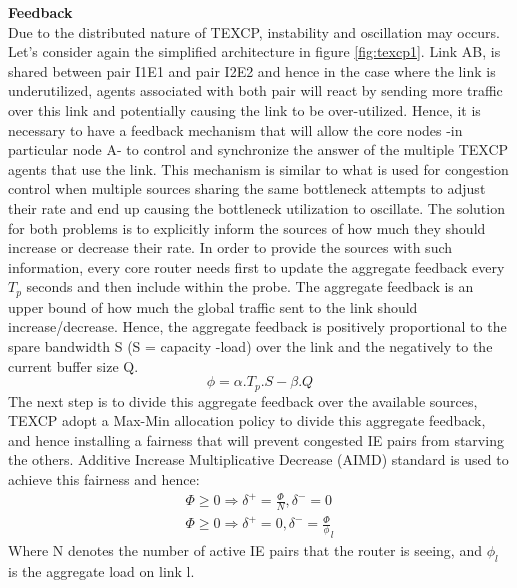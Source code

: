 {\bf Feedback}
\\Due to the distributed nature of TEXCP, instability and oscillation may occurs. Let's consider again the simplified architecture in figure \ref{fig:texcp1}. Link AB, is shared between pair I1E1 and pair I2E2 and hence in the case where the link is underutilized, agents associated with both pair will react by sending more traffic over this link and potentially causing the link to be over-utilized. Hence, it is necessary to have a feedback mechanism that will allow the core nodes -in particular node A-  to control and synchronize the answer of the multiple TEXCP agents that use the link. This mechanism is similar to what is used for congestion control when multiple sources sharing the same bottleneck attempts to adjust their rate and end up causing the bottleneck utilization to oscillate. The solution for both problems is to explicitly inform the sources of how much they should increase or decrease their rate. In order to provide the sources with such information, every core router needs first to update the aggregate feedback every $T_{p}$ seconds and then include within the probe. The aggregate feedback is an upper bound of how much the global traffic sent to the link should increase/decrease. Hence, the aggregate feedback is positively proportional to the spare bandwidth S (S = capacity -load) over the link and the negatively to the current buffer size Q.
\begin {equation}
\phi = \alpha . T_{p} . S - \beta . Q
\end {equation}
The next step is to divide this aggregate feedback over the available sources, TEXCP adopt a Max-Min allocation policy to divide this aggregate feedback, and hence installing a fairness that will prevent congested IE pairs from starving the others. Additive Increase Multiplicative Decrease (AIMD) standard is used to achieve this fairness and hence: 
\begin {eqnarray}
\Phi \ge 0 \Rightarrow \delta^+ = \frac{\Phi} {N}, \delta^- = 0 \\
\Phi \ge 0 \Rightarrow \delta^+ = 0 , \delta^- = \frac{\Phi} \phi_l
\end {eqnarray}
Where N denotes the number of active IE pairs that the router is seeing, and $\phi_l$ is the aggregate load on link l.

